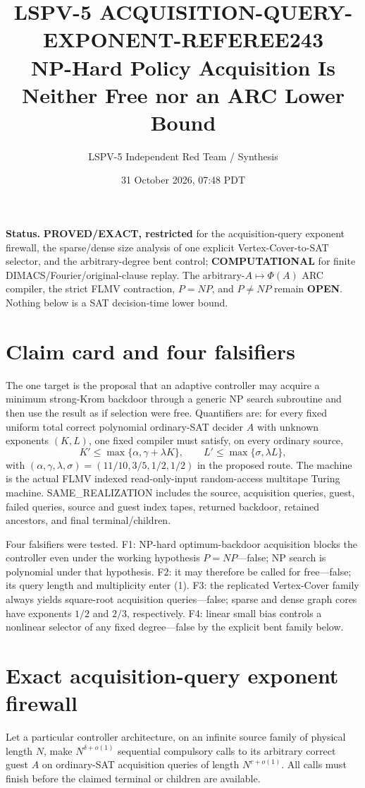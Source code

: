 \documentclass[11pt]{article}
\title{LSPV-5 ACQUISITION-QUERY-EXPONENT-REFEREE243\\
NP-Hard Policy Acquisition Is Neither Free nor an ARC Lower Bound}
\author{LSPV-5 Independent Red Team / Synthesis}
\date{31 October 2026, 07:48 PDT}
\begin{document}
\maketitle

\noindent\textbf{Status.}
\textbf{PROVED/EXACT, restricted} for the acquisition-query exponent firewall,
the sparse/dense size analysis of one explicit Vertex-Cover-to-SAT selector,
and the arbitrary-degree bent control; \textbf{COMPUTATIONAL} for finite
DIMACS/Fourier/original-clause replay.  The arbitrary-$A\mapsto\Phi(A)$ ARC
compiler, the strict FLMV contraction, $P=NP$, and $P\ne NP$ remain
\textbf{OPEN}.  Nothing below is a SAT decision-time lower bound.

\section{Claim card and four falsifiers}
The one target is the proposal that an adaptive controller may acquire a
minimum strong-Krom backdoor through a generic NP search subroutine and then
use the result as if selection were free.  Quantifiers are: for every fixed
uniform total correct polynomial ordinary-SAT decider $A$ with unknown
exponents $(K,L)$, one fixed compiler must satisfy, on every ordinary source,
\[
 K'\le\max\{\alpha,\gamma+\lambda K\},\qquad
 L'\le\max\{\sigma,\lambda L\},                         \tag{1}
\]
with $(\alpha,\gamma,\lambda,\sigma)=(11/10,3/5,1/2,1/2)$
in the proposed route.  The machine is the actual FLMV indexed read-only-input
random-access multitape Turing machine.  SAME\_REALIZATION includes the
source, acquisition queries, guest, failed queries, source and guest index
tapes, returned backdoor, retained ancestors, and final terminal/children.

Four falsifiers were tested.  F1: NP-hard optimum-backdoor acquisition blocks
the controller even under the working hypothesis $P=NP$---false; NP search is
polynomial under that hypothesis.  F2: it may therefore be called for
free---false; its query length and multiplicity enter (1).  F3: the replicated
Vertex-Cover family always yields square-root acquisition queries---false;
sparse and dense graph cores have exponents $1/2$ and $2/3$, respectively.
F4: linear small bias controls a nonlinear selector of any fixed degree---false
by the explicit bent family below.

\section{Exact acquisition-query exponent firewall}
Let a particular controller architecture, on an infinite source family of
physical length $N$, make $N^{\delta+o(1)}$ sequential compulsory calls to its
arbitrary correct guest $A$ on ordinary-SAT acquisition queries of length
$N^{c+o(1)}$.  All calls must finish before the claimed terminal or children
are available.
\end{document}

